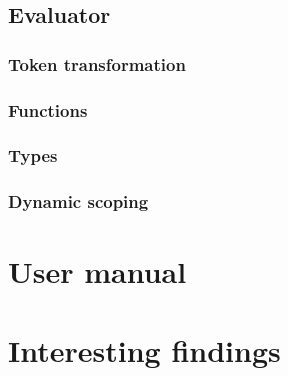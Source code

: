 \documentclass[11pt]{article}
\begin{document}
\subsection{Evaluator}

	\subsubsection{Token transformation}
	\subsubsection{Functions}
	\subsubsection{Types}
	\subsubsection{Dynamic scoping}

\section{User manual}

\section{Interesting findings}
\end{document}
